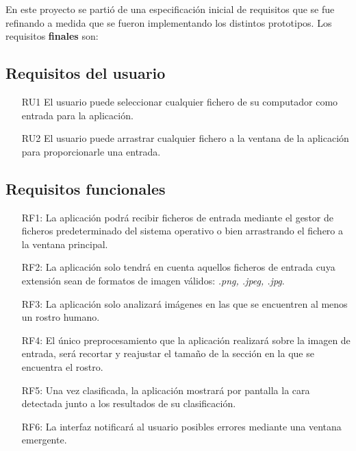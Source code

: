 \documentclass[a4paper,11pt]{book}
\begin{document}











En este proyecto se partió de una especificación inicial de requisitos que se fue refinando a medida que se fueron implementando los distintos prototipos. Los requisitos \textbf{finales} son:
\subsection{Requisitos del usuario}
\begin{itemize}
	\item [RU1] El usuario puede seleccionar cualquier fichero de su computador como entrada para la aplicación.
	\item [RU2] El usuario puede arrastrar cualquier fichero a la ventana de la aplicación para proporcionarle una entrada.
\end{itemize}
\subsection{Requisitos funcionales}
\begin{itemize}
	\item [RF1:] La aplicación podrá recibir ficheros de entrada mediante el gestor de ficheros predeterminado del sistema operativo o bien arrastrando el fichero a la ventana principal.
	\item [RF2:] La aplicación solo tendrá en cuenta aquellos ficheros de entrada cuya extensión sean de formatos de imagen válidos: \textit{.png, .jpeg, .jpg}.
	\item [RF3:] La aplicación solo analizará imágenes en las que se encuentren al menos un rostro humano.
	\item [RF4:] El único preprocesamiento que la aplicación realizará sobre la imagen de entrada, será recortar y reajustar el tamaño de la sección en la que se encuentra el rostro.
	\item [RF5:] Una vez clasificada, la aplicación mostrará por pantalla la cara detectada junto a los resultados de su clasificación.
	\item [RF6:] La interfaz notificará al usuario posibles errores mediante una ventana emergente.

\end{itemize}
\end{document}
